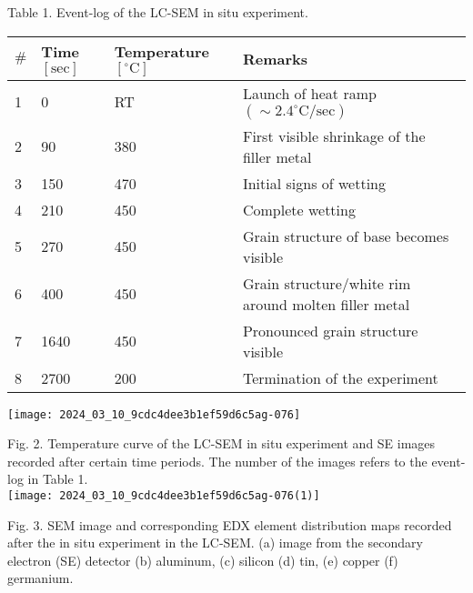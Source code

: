 \documentclass[10pt]{article}
\begin{document}
Table 1. Event-log of the LC-SEM in situ experiment.

\begin{center}
\begin{tabular}{l|l|l|l}
\hline
$\#$ & Time $[\mathrm{sec}]$ & Temperature $\left[{ }^{\circ} \mathrm{C}\right]$ & Remarks \\
\hline
1 & 0 & RT & Launch of heat ramp $\left(\sim 2.4^{\circ} \mathrm{C} / \mathrm{sec}\right)$ \\
\hline
2 & 90 & 380 & First visible shrinkage of the filler metal \\
\hline
3 & 150 & 470 & Initial signs of wetting \\
\hline
4 & 210 & 450 & Complete wetting \\
\hline
5 & 270 & 450 & Grain structure of base becomes visible \\
\hline
6 & 400 & 450 & Grain structure/white rim around molten filler metal \\
\hline
7 & 1640 & 450 & Pronounced grain structure visible \\
\hline
8 & 2700 & 200 & Termination of the experiment \\
\hline
\end{tabular}
\end{center}

\begin{center}
\texttt{[image: 2024\_03\_10\_9cdc4dee3b1ef59d6c5ag-076]}
\end{center}

Fig. 2. Temperature curve of the LC-SEM in situ experiment and SE images recorded after certain time periods. The number of the images refers to the event-log in Table 1.\\
\texttt{[image: 2024\_03\_10\_9cdc4dee3b1ef59d6c5ag-076(1)]}

Fig. 3. SEM image and corresponding EDX element distribution maps recorded after the in situ experiment in the LC-SEM. (a) image from the secondary electron (SE) detector (b) aluminum, (c) silicon (d) tin, (e) copper (f) germanium.
\end{document}
